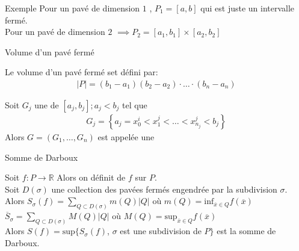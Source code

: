 \begin{parag}{Exemple}
    Pour un pavé de dimension $1$ , $P_1 =  \left[a, b\right]$ qui est juste un intervalle fermé.\\
    Pour un pavé de dimension $2$ $\implies P_2 = \left[a_1, b_1\right] \times \left[a_2, b_2\right]$
\end{parag}
\begin{parag}{Volume d'un pavé fermé}
    \begin{definition}
        Le volume d'un pavé fermé set défini par:
        \begin{align*} \left|P\right| =  \left(b_1 - a_1\right)\left(b_2 - a_2\right) \cdot  \ldots \cdot  \left(b_n - a_n\right) \end{align*}
    \end{definition}

    \begin{definition}
        Soit $G_j$ une  de $\left[a_j, b_j\right]; a_j < b_j$ tel que
        \begin{align*} G_j =  \left\{a_j =  x_0^i < x_1^j < \ldots < x_{n_j}^j < b_j\right\} \end{align*}
        Alors $G = \left(G_1, \ldots, G_n\right)$ est appelée une 
    \end{definition}

\end{parag}
\begin{parag}{Somme de Darboux}
    \begin{definition}
        Soit $f: P \to \mathbb{R}$  Alors on définit  de $f$ sur $P$.\\
        Soit $D\left(\sigma\right)$ une collection des pavées fermés engendrée par la subdivision $\sigma$.\\
        Alors $S_{\sigma}\left(f\right) =  \sum_{Q \subset D\left(\sigma\right)}m\left(Q\right)\left|Q\right| $ où $m\left(Q\right) =  \text{inf}_{\overline{x}\in Q}f\left(\overline{x}\right)$\\
        $\overline{S}_{\sigma} =  \sum_{Q \subset D\left(\sigma\right)} M\left(Q\right) \left|Q\right| $ où $M\left(Q\right) =  \text{sup}_{\overline{x}\in Q}f\left(\overline{x}\right)$\\
        Alors $S\left(f\right) = \text{sup}\{S_{\sigma}\left(f\right)$, $\sigma$ est une subdivision de $P \}$ est la somme de Darboux.\\

    \end{definition}
\end{parag}

